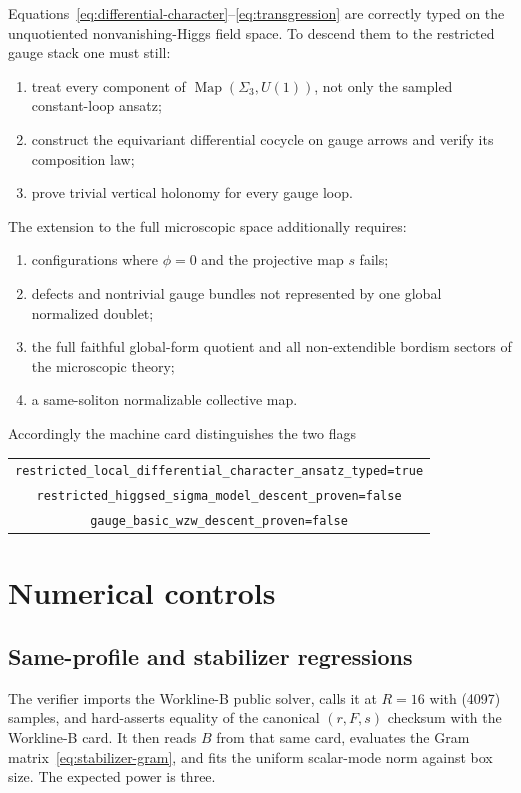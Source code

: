 \documentclass[11pt]{article}
\theoremstyle{definition}
\theoremstyle{remark}
\begin{document}
Equations~\eqref{eq:differential-character}--\eqref{eq:transgression} are
correctly typed on the unquotiented nonvanishing-Higgs field space.  To
descend them to the restricted gauge stack one must still:
\begin{enumerate}[label=(R\arabic*)]
\item treat every component of \(\operatorname{Map}(\Sigma_3,U(1))\), not
  only the sampled constant-loop ansatz;
\item construct the equivariant differential cocycle on gauge arrows and
  verify its composition law;
\item prove trivial vertical holonomy for every gauge loop.
\end{enumerate}
The extension to the full microscopic space additionally requires:
\begin{enumerate}[label=(D\arabic*)]
\item configurations where \(\phi=0\) and the projective map \(s\) fails;
\item defects and nontrivial gauge bundles not represented by one global
  normalized doublet;
\item the full faithful global-form quotient and all non-extendible bordism
  sectors of the microscopic theory;
\item a same-soliton normalizable collective map.
\end{enumerate}
Accordingly the machine card distinguishes the two flags
\begin{center}
\footnotesize
\begin{tabular}{c}
\texttt{restricted\_local\_differential\_character\_ansatz\_typed=true}\\
\texttt{restricted\_higgsed\_sigma\_model\_descent\_proven=false}\\
\texttt{gauge\_basic\_wzw\_descent\_proven=false}
\end{tabular}
\end{center}

\section{Numerical controls}

\subsection{Same-profile and stabilizer regressions}

The verifier imports the Workline-B public solver, calls it at
\(R=16\) with (4097) samples, and hard-asserts equality of the canonical
\((r,F,s)\) checksum with the Workline-B card.  It then reads \(B\) from that
same card, evaluates the Gram matrix~\eqref{eq:stabilizer-gram}, and fits the
uniform scalar-mode norm against box size.  The expected power is three.
\end{document}
